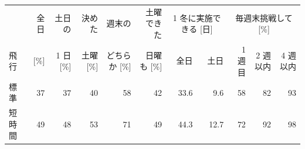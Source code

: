 \begin{tabular}{lrrrrrrrrrr}
\toprule
& 全日 & 土日の & 決めた & 週末の & 土曜できた & \multicolumn{2}{c}{1 冬に実施できる [日]} & \multicolumn{3}{c}{毎週末挑戦して [\%]} \\
飛行 & [\%] & 1 日 [\%] & 土曜 [\%] & どちらか [\%] & 日曜も [\%] & 全日 & 土日 & 1 週目 & 2 週以内 & 4 週以内 \\
\midrule
標準 & 37 & 37 & 40 & 58 & 42 & 33.6 & 9.6 & 58 & 82 & 93 \\
短時間 & 49 & 48 & 53 & 71 & 49 & 44.3 & 12.7 & 72 & 92 & 98 \\
\bottomrule
\end{tabular}
